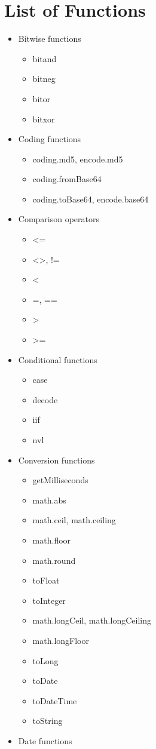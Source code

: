 
\section{List of Functions}

\begin{itemize}
    \item Bitwise functions
    \begin{itemize}
        \item bitand 
        \item bitneg 
        \item bitor 
        \item bitxor 
    \end{itemize}
    \item Coding functions
    \begin{itemize}
        \item coding.md5, encode.md5 
        \item coding.fromBase64 
        \item coding.toBase64, encode.base64 
    \end{itemize}
    \item Comparison operators
    \begin{itemize}
        \item <= 
        \item <>, != 
        \item < 
        \item =, == 
        \item > 
        \item >= 
    \end{itemize}
    \item Conditional functions
    \begin{itemize}
        
\item case 
\item decode 
\item iif 
\item nvl 
    \end{itemize}
    \item Conversion functions
    \begin{itemize}
 
\item getMilliseconds 
\item math.abs 
\item math.ceil, math.ceiling 
\item math.floor 
\item math.round 
\item toFloat 
\item toInteger 
\item math.longCeil, math.longCeiling 
\item math.longFloor 
\item toLong 
\item toDate 
\item toDateTime 
\item toString 
    \end{itemize}
    \item Date functions
    \begin{itemize}
        

\end{itemize}
\end{itemize}
